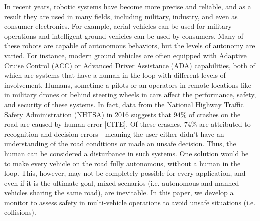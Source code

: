 \documentclass[letterpaper, 10 pt, conference]{ieeeconf}  %
\newcommand\NB[1]{$\spadesuit$\footnote{NB: #1}}
\begin{document}

In recent years, robotic systems have become more precise and reliable, and as a result they are used in many fields, including military, industry, and even as consumer electronics. For example, aerial vehicles can be used for military operations and intelligent ground vehicles can be used by consumers. Many of these robots are capable of autonomous behaviors, but the levels of autonomy are varied. For instance, modern ground vehicles are often equipped with Adaptive Cruise Control (ACC)\cite{acc} or Advanced Driver Assistance (ADA)\cite{adas} capabilities, both of which are systems that have a human in the loop with different levels of involvement. Humans, sometime a pilots or an operators in remote locations like in military drones or behind steering wheels in cars affect the performance, safety, and security of these systems. In fact, data from the National Highway Traffic Safety Administration (NHTSA) in 2016 suggests that $94\%$ of crashes on the road are caused by human error [CITE]. Of these crashes, $74\%$ are attributed to recognition and decision errors - meaning the user either didn't have an understanding of the road conditions or made an unsafe decision. Thus, the human can be considered a disturbance in such systems. One solution would be to make every vehicle on the road fully autonomous, without a human in the loop. This, however, may not be completely possible for every application, and even if it is the ultimate goal, mixed scenarios (i.e. autonomous and manned vehicles sharing the same road), are inevitable. In this paper, we develop a monitor to assess safety in multi-vehicle operations to avoid unsafe situations (i.e. collisions).
\end{document}

